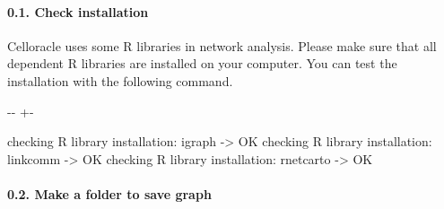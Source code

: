 \documentclass[letterpaper,10pt,english]{sphinxmanual}
\newlength\nbsphinxcodecellspacing
\begin{document}
\paragraph{0.1. Check installation}
\label{\detokenize{notebooks/04_Network_analysis/Network_analysis_with_with_Paul_etal_2015_data:0.1.-Check-installation}}
Celloracle uses some R libraries in network analysis. Please make sure that all dependent R libraries are installed on your computer. You can test the installation with the following command.

{
%
\begin{sphinxVerbatim}[commandchars=\\\{\}]
\llap{\color{nbsphinxin}[5]:\,\hspace{\fboxrule}\hspace{\fboxsep}}
\end{sphinxVerbatim}
}



%
{
\kern-\sphinxverbatimsmallskipamount\kern-\baselineskip
\kern+\FrameHeightAdjust\kern-\fboxrule
\vspace{\nbsphinxcodecellspacing}
%
\begin{sphinxVerbatim}[commandchars=\\\{\}]
checking R library installation: igraph -> OK
checking R library installation: linkcomm -> OK
checking R library installation: rnetcarto -> OK
\end{sphinxVerbatim}
}
\relax


\paragraph{0.2. Make a folder to save graph}
\label{\detokenize{notebooks/04_Network_analysis/Network_analysis_with_with_Paul_etal_2015_data:0.2.-Make-a-folder-to-save-graph}}
{
%
\begin{sphinxVerbatim}[commandchars=\\\{\}]
\llap{\color{nbsphinxin}[6]:\,\hspace{\fboxrule}\hspace{\fboxsep}}  
 
\end{sphinxVerbatim}
}
\end{document}
